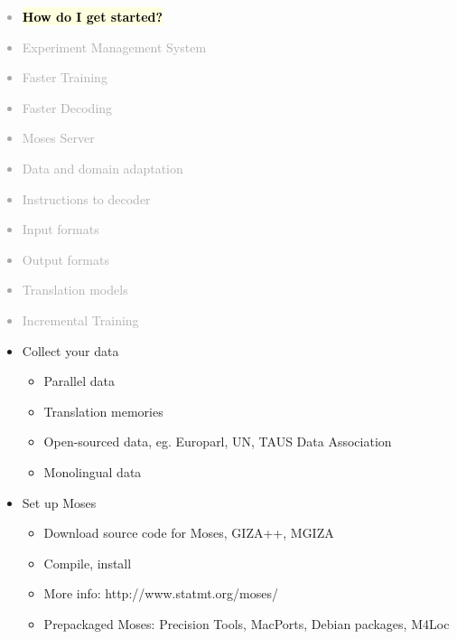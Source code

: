 \documentclass[landscape]{uedslides2C}
\newcommand{\currenttopic}[1]{\colorbox{lightyellow}{\textcolor{black}{\bf #1}}}
\begin{document}

\small
\vspace{-5mm}
\textcolor{darkgrey}{
\begin{itemize} \itemsep -1mm
\item \currenttopic{How do I get started?}
\item {Experiment Management System}
\item {Faster Training}
\item {Faster Decoding}
\item {Moses Server}
\item {Data and domain adaptation}
\item {Instructions to decoder}
\item {Input formats}
\item {Output formats}
\item {Translation models}
\item {Incremental Training}
\end{itemize}
}


\normalsize
\begin{itemize} \itemsep -1mm

\item{Collect your data}
  \begin{itemize}
  \item Parallel data 
  \item Translation memories
  \item Open-sourced data, eg. Europarl, UN, TAUS Data Association
  \item Monolingual data
  \end{itemize}
\item{Set up Moses}
  \begin{itemize}
  \item Download source code for Moses, GIZA++, MGIZA
  \item Compile, install
  \item More info:
        http://www.statmt.org/moses/
  \item Prepackaged Moses:
        Precision Tools, MacPorts, Debian packages, M4Loc
  \end{itemize}
\end{itemize}

\end{document}
